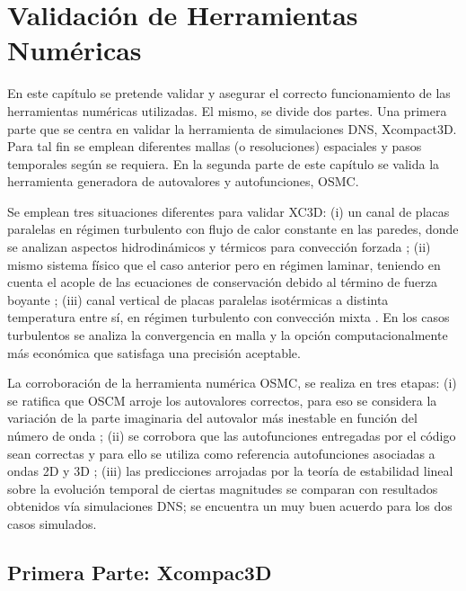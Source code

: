 \chapter{Validación de Herramientas Numéricas} \label{cap:validacion}


En este capítulo se pretende validar y asegurar el correcto funcionamiento de las herramientas numéricas utilizadas. El mismo, se divide dos partes. Una primera parte que se centra en validar la herramienta de simulaciones DNS, Xcompact3D. Para tal fin se emplean diferentes mallas (o resoluciones) espaciales y pasos temporales según se requiera. En la segunda parte de este capítulo se valida la herramienta generadora de autovalores y autofunciones, OSMC.

Se emplean tres situaciones diferentes para validar XC3D: (i) un canal de placas paralelas en régimen turbulento con flujo de calor constante en las paredes, donde se analizan aspectos hidrodinámicos y térmicos para convección forzada \cite{moser1999, kawamura2000dns}; (ii) mismo sistema físico que el caso anterior pero en régimen laminar, teniendo en cuenta el acople de las ecuaciones de conservación debido al término de fuerza boyante \linebreak \cite{chen1996linear}; (iii) canal vertical de placas paralelas isotérmicas a distinta temperatura entre sí, en régimen  turbulento con convección mixta \cite{guo2022direct}. En los casos turbulentos se analiza la convergencia en malla y la opción computacionalmente más económica que satisfaga una precisión aceptable.

La corroboración de la herramienta numérica OSMC, se realiza en tres etapas: (i) se ratifica que OSCM arroje los autovalores correctos, para eso se considera la variación de la parte imaginaria del autovalor más inestable en función del número de onda \cite{chen1996linear}; (ii) se corrobora que las autofunciones entregadas por el código sean correctas y para ello se utiliza como referencia autofunciones asociadas a ondas 2D y 3D \cite{chen2003direct}; (iii) las predicciones arrojadas por la teoría de estabilidad lineal sobre la evolución temporal de ciertas magnitudes se comparan con resultados obtenidos vía simulaciones DNS; se encuentra un muy buen acuerdo para los dos casos simulados.


\newpage
 
\section{Primera Parte: Xcompac3D}

